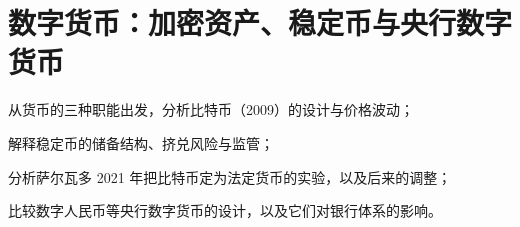 \chapter{数字货币：加密资产、稳定币与央行数字货币}\label{ch:digitalmoney}

\begin{chapterguide}
\begin{guidegoals}
\item 从货币的三种职能出发，分析比特币（2009）的设计与价格波动；
\item 解释稳定币的储备结构、挤兑风险与监管；
\item 分析萨尔瓦多 2021 年把比特币定为法定货币的实验，以及后来的调整；
\item 比较数字人民币等央行数字货币的设计，以及它们对银行体系的影响。
\end{guidegoals}
\end{chapterguide}

\chapterstub
